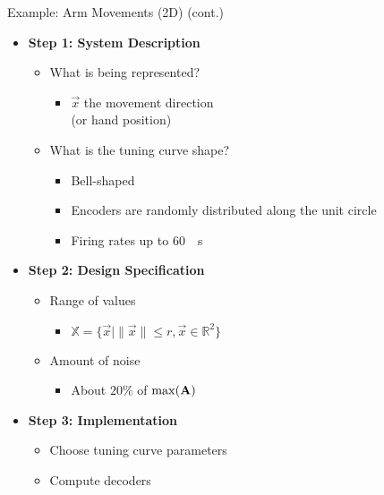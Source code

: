 \documentclass[handout,aspectratio=169]{beamer}
\begin{document}
\begin{frame}{Example: Arm Movements (2D) (cont.)}
	\begin{multicols}{2}
		\begin{itemize}
			\setlength{\itemsep}{0.5cm}
			\item \textbf{Step 1: System Description}
			\begin{itemize}
				\setlength{\itemsep}{0.5cm}
				\item What is being represented?
				\begin{itemize}
					\setlength{\itemsep}{0.25cm}
					\item $\vec x$ the movement direction\\(or hand position)
				\end{itemize}
				\item What is the tuning curve shape?
				\begin{itemize}
					\setlength{\itemsep}{0.25cm}
					\item Bell-shaped
					\item Encoders are randomly distributed along the unit circle
					\item Firing rates up to \SI{60}{\per\second}
				\end{itemize}
			\end{itemize}
			\columnbreak
			\item \textbf{Step 2: Design Specification}
			\begin{itemize}
				\setlength{\itemsep}{0.25cm}
				\item Range of values
				\begin{itemize}
					\item $\mathbb{X} = \{\vec x \mid \|\vec x\| \leq r, \vec x \in \mathbb{R}^2 \}$
				\end{itemize}
				\item Amount of noise
				\begin{itemize}
					\setlength{\itemsep}{0.25cm}
					\item About $20\%$ of $\max({\mathbf{A}})$
				\end{itemize}
			\end{itemize}
			\item \textbf{Step 3: Implementation}
			\begin{itemize}
				\setlength{\itemsep}{0.25cm}
				\item Choose tuning curve parameters
				\item Compute decoders
			\end{itemize}
		\end{itemize}
	\end{multicols}
\end{frame}
\end{document}
